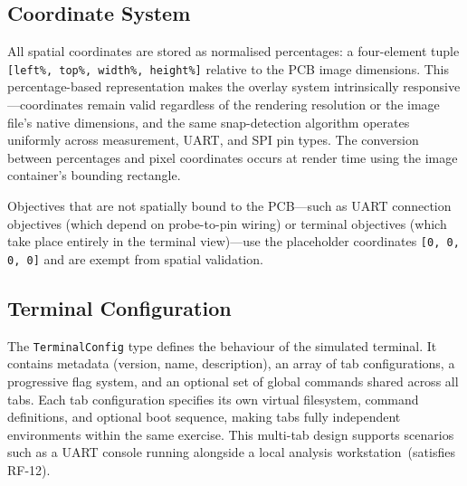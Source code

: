 \subsection{Coordinate System}\label{subsec:coords}

All spatial coordinates are stored as normalised percentages: a four-element tuple \texttt{[left\%, top\%, width\%, height\%]} relative to the PCB image dimensions. This percentage-based representation makes the overlay system intrinsically responsive---coordinates remain valid regardless of the rendering resolution or the image file's native dimensions, and the same snap-detection algorithm operates uniformly across measurement, UART, and SPI pin types. The conversion between percentages and pixel coordinates occurs at render time using the image container's bounding rectangle.

Objectives that are not spatially bound to the PCB---such as UART connection objectives (which depend on probe-to-pin wiring) or terminal objectives (which take place entirely in the terminal view)---use the placeholder coordinates \texttt{[0, 0, 0, 0]} and are exempt from spatial validation.

\subsection{Terminal Configuration}\label{subsec:terminal-model}

The \texttt{TerminalConfig} type defines the behaviour of the simulated terminal. It contains metadata (version, name, description), an array of tab configurations, a progressive flag system, and an optional set of global commands shared across all tabs. Each tab configuration specifies its own virtual filesystem, command definitions, and optional boot sequence, making tabs fully independent environments within the same exercise. This multi-tab design supports scenarios such as a UART console running alongside a local analysis workstation~(satisfies RF-12).

